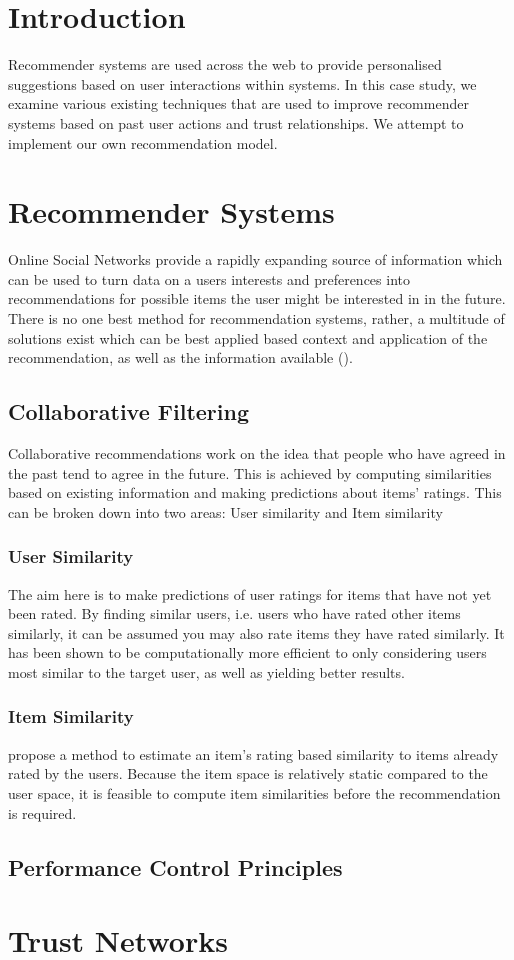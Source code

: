\documentclass[a4paper,11pt,article,oneside]{memoir}
\begin{document}
	
	\tableofcontents
	\chapter{Introduction}
	Recommender systems are used across the web to provide personalised suggestions based on user interactions within systems. In this case study, we examine various existing techniques that are used to improve recommender systems based on past user actions and trust relationships. We attempt to implement our own recommendation model.
	
	
	\newpage
	\chapter{Recommender Systems}
	
	
	Online Social Networks provide a rapidly expanding source of information which can be used to turn data on a users interests and preferences into recommendations for possible items the user might be interested in in the future. There is no one best method for recommendation systems, rather, a multitude of solutions exist which can be best applied based context and application of the recommendation, as well as the information available (\cite{Lu2012Recommender}).
	
	\section{Collaborative Filtering}
	Collaborative recommendations work on the idea that people who have agreed in the past tend to agree in the future{\cite{zeng2010can}}. This is achieved by computing similarities based on existing information and making predictions about items' ratings. This can be broken down into two areas: User similarity and Item similarity
	\subsection{User Similarity} 
	The aim here is to make predictions of user ratings for items that have not yet been rated. By finding similar users, i.e. users who have rated other items similarly, it can be assumed you may also rate items they have rated similarly. It has been shown to be computationally more efficient to only considering users most similar to the target user, as well as yielding better results. {\cite{goldberg2001eigentaste}}
	\subsection{Item Similarity} 
	{\cite{sarwar2001item}} propose a method to estimate an item's rating based similarity to items already rated by the users. Because the item space is relatively static compared to the user space, it is feasible to compute item similarities before the recommendation is required. 
	\section{Performance Control Principles}
	

	\chapter{Trust Networks}
	\newpage
	\nocite{*}
	
\end{document}
